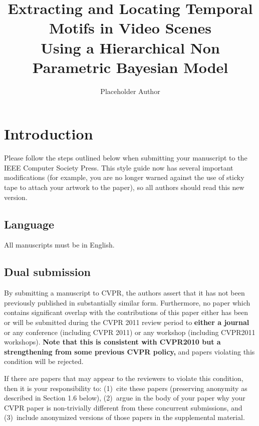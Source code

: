 \documentclass[10pt,twocolumn,letterpaper]{article}
\begin{document}
\title{Extracting and Locating Temporal Motifs in Video Scenes
\\ Using a Hierarchical Non Parametric Bayesian Model}

\author{Placeholder Author}

\maketitle




\section{Introduction}

Please follow the steps outlined below when submitting your manuscript to
the IEEE Computer Society Press.  This style guide now has several
important modifications (for example, you are no longer warned against the
use of sticky tape to attach your artwork to the paper), so all authors
should read this new version.

\subsection{Language}

All manuscripts must be in English.

\subsection{Dual submission}

By submitting a manuscript to CVPR, the authors assert that it has not been
previously published in substantially similar form. Furthermore, no paper
which contains significant overlap with the contributions of this paper
either has been or will be submitted during the CVPR 2011 review period to
{\bf either a journal} or any conference (including CVPR 2011) or any
workshop (including CVPR2011 workshops).  {\bf Note that
  this is consistent with CVPR2010 but a strengthening from some previous CVPR
  policy,} and papers violating this condition will be rejected.

If there are papers that may appear to the reviewers
to violate this condition, then it is your responsibility to: (1)~cite
these papers (preserving anonymity as described in Section 1.6 below),
(2)~argue in the body of your paper why your CVPR paper is non-trivially
different from these concurrent submissions, and (3)~include anonymized
versions of those papers in the supplemental material.
\end{document}
